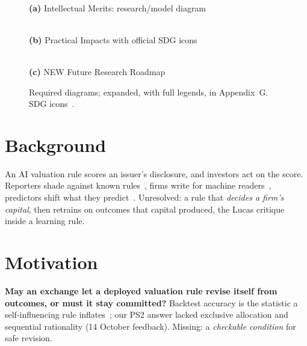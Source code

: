 \begin{figure}[t]
\centering\scriptsize
\begin{minipage}[t]{0.30\textwidth}\centering
\resizebox{\linewidth}{!}{}\\[1pt]
\textbf{(a)} Intellectual Merits: research/model diagram
\end{minipage}\hfill
\begin{minipage}[t]{0.30\textwidth}\centering
\resizebox{\linewidth}{!}{}\\[1pt]
\textbf{(b)} Practical Impacts with official SDG icons
\end{minipage}\hfill
\begin{minipage}[t]{0.30\textwidth}\centering
\resizebox{\linewidth}{!}{}\\[1pt]
\textbf{(c)} NEW Future Research Roadmap
\end{minipage}
\caption{Required diagrams; expanded, with full legends, in Appendix~G. SDG icons~\cite{un_sdg,un_sdg_icons}.}
\label{fig:diagrams}
\end{figure}

\section{Background}
An AI valuation rule scores an issuer's disclosure, and investors act on the score. Reporters shade against known rules~\cite{lacker1989,crocker2007}, firms write for machine readers~\cite{cao2023machine}, predictors shift what they predict~\cite{perdomo2020}. Unresolved: a rule that \emph{decides a firm's capital}, then retrains on outcomes that capital produced, the Lucas critique~\cite{lucas1976} inside a learning rule.

\section{Motivation}
\textbf{May an exchange let a deployed valuation rule revise itself from outcomes, or must it stay committed?} Backtest accuracy is the statistic a self-influencing rule inflates~\cite{sec2024aiwashing}; our PS2 answer lacked exclusive allocation and sequential rationality (14 October feedback). Missing: a \emph{checkable condition} for safe revision.

